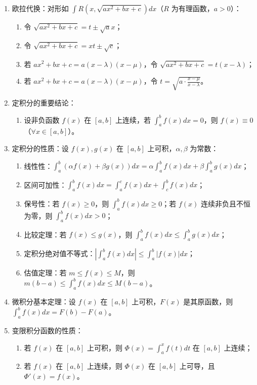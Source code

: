 \documentclass[UTF8]{ctexart}
\theoremstyle{remark}
\begin{document}
\begin{enumerate}
	\item 欧拉代换：对形如 \(\int R(x, \sqrt{ax^2 + bx + c})dx\)（\(R\) 为有理函数，\(a > 0\)）：
	\begin{enumerate}
		\item 令 \(\sqrt{ax^2 + bx + c} = t \pm \sqrt{a}x\)；
		\item 令 \(\sqrt{ax^2 + bx + c} = xt \pm \sqrt{c}\)；
		\item 若 \(ax^2 + bx + c = a(x - \lambda)(x - \mu)\)，令 \(\sqrt{ax^2 + bx + c} = t(x - \lambda)\)；
		\item 若 \(ax^2 + bx + c = a(x - \lambda)(x - \mu)\)，令 \(t = \sqrt{a \cdot \frac{x - \mu}{x - \lambda}}\)。
	\end{enumerate}
	
	\item 定积分的重要结论：
	\begin{enumerate}
		\item 设非负函数 \(f(x)\) 在 \([a, b]\) 上连续，若 \(\int_{a}^{b}f(x)dx = 0\)，则 \(f(x) \equiv 0\)（\(\forall x \in [a, b]\)）。
	\end{enumerate}
	
	\item 定积分的性质：设 \(f(x), g(x)\) 在 \([a, b]\) 上可积，\(\alpha, \beta\) 为常数：
	\begin{enumerate}
		\item 线性性：\(\int_{a}^{b}(\alpha f(x) + \beta g(x))dx = \alpha\int_{a}^{b}f(x)dx + \beta\int_{a}^{b}g(x)dx\)；
		\item 区间可加性：\(\int_{a}^{b}f(x)dx = \int_{a}^{c}f(x)dx + \int_{c}^{b}f(x)dx\)；
		\item 保号性：若 \(f(x) \geq 0\)，则 \(\int_{a}^{b}f(x)dx \geq 0\)；若 \(f(x)\) 连续非负且不恒为零，则 \(\int_{a}^{b}f(x)dx > 0\)；
		\item 比较定理：若 \(f(x) \leq g(x)\)，则 \(\int_{a}^{b}f(x)dx \leq \int_{a}^{b}g(x)dx\)；
		\item 定积分绝对值不等式：\(\left|\int_{a}^{b}f(x)dx\right| \leq \int_{a}^{b}|f(x)|dx\)；
		\item 估值定理：若 \(m \leq f(x) \leq M\)，则 \(m(b - a) \leq \int_{a}^{b}f(x)dx \leq M(b - a)\)。
	\end{enumerate}
	
	\item 微积分基本定理：设 \(f(x)\) 在 \([a, b]\) 上可积，\(F(x)\) 是其原函数，则 \(\int_{a}^{b}f(x)dx = F(b) - F(a)\)。
	
	\item 变限积分函数的性质：
	\begin{enumerate}
		\item 若 \(f(x)\) 在 \([a, b]\) 上可积，则 \(\Phi(x) = \int_{a}^{x}f(t)dt\) 在 \([a, b]\) 上连续；
		\item 若 \(f(x)\) 在 \([a, b]\) 上连续，则 \(\Phi(x)\) 在 \([a, b]\) 上可导，且 \(\Phi'(x) = f(x)\)。
	\end{enumerate}
	

\end{enumerate}
\end{document}
